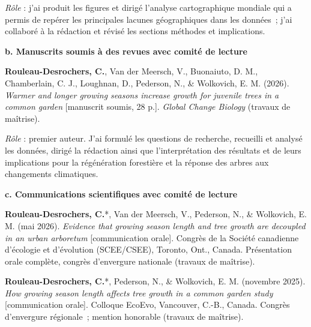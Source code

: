 \documentclass[12pt]{article}
\begin{document}
\textit{Rôle} : j'ai produit les figures et dirigé l'analyse cartographique mondiale qui a permis de repérer les principales lacunes géographiques dans les données~; j'ai collaboré à la rédaction et révisé les sections méthodes et implications.

\textbf{b. Manuscrits soumis à des revues avec comité de lecture} 

\textbf{Rouleau-Desrochers, C.}, Van der Meersch, V., Buonaiuto, D. M., Chamberlain, C. J., Loughnan, D., Pederson, N., \& Wolkovich, E. M. (2026). \textit{Warmer and longer growing seasons increase growth for juvenile trees in a common garden} [manuscrit soumis, 28 p.]. \textit{Global Change Biology} (travaux de maîtrise). 

\textit{Rôle} : premier auteur. J'ai formulé les questions de recherche, recueilli et analysé les données, dirigé la rédaction ainsi que l'interprétation des résultats et de leurs implications pour la régénération forestière et la réponse des arbres aux changements climatiques.

\textbf{c. Communications scientifiques avec comité de lecture} 

\textbf{Rouleau-Desrochers, C.}*, Van der Meersch, V., Pederson, N., \& Wolkovich, E. M. (mai 2026). \textit{Evidence that growing season length and tree growth are decoupled in an urban arboretum} [communication orale]. Congrès de la Société canadienne d'écologie et d'évolution (SCEE/CSEE), Toronto, Ont., Canada. Présentation orale complète, congrès d'envergure nationale (travaux de maîtrise). 

\textbf{Rouleau-Desrochers, C.}*, Pederson, N., \& Wolkovich, E. M. (novembre 2025). \textit{How growing season length affects tree growth in a common garden study} [communication orale]. Colloque EcoEvo, Vancouver, C.-B., Canada. Congrès d'envergure régionale~; mention honorable (travaux de maîtrise).
\end{document}
